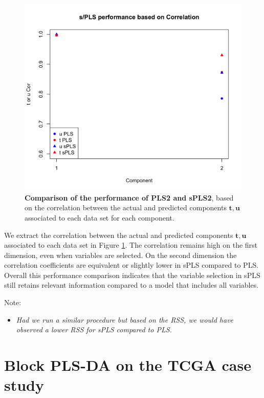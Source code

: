\documentclass[]{book}
\providecommand{\tightlist}{%
  \setlength{\itemsep}{0pt}\setlength{\parskip}{0pt}}
\begin{document}
\begin{figure}

{\centering \includegraphics[width=0.7\linewidth]{Figures/PLS/pls-perf-spls2-1} 

}

\caption{\textbf{Comparison of the performance of PLS2 and
sPLS2}, based on the correlation between the actual and predicted
components \(\boldsymbol{t,u}\) associated to each data set for each
component.}\label{fig:pls-perf-spls2}
\end{figure}






We extract the correlation between the actual and predicted components
\(\boldsymbol{t,u}\) associated to each data set in Figure
\ref{fig:pls-perf-spls2}. The correlation remains high on the first
dimension, even when variables are selected. On the second dimension the
correlation coefficients are equivalent or slightly lower in sPLS
compared to PLS. Overall this performance comparison indicates that the
variable selection in sPLS still retains relevant information compared
to a model that includes all variables.

Note:

\begin{itemize}
\tightlist
\item
  \emph{Had we run a similar procedure but based on the RSS, we would
  have observed a lower RSS for sPLS compared to PLS.}
\end{itemize}

\chapter{Block PLS-DA on the TCGA case
study}\label{blockplsda-tcga-case}
\end{document}
